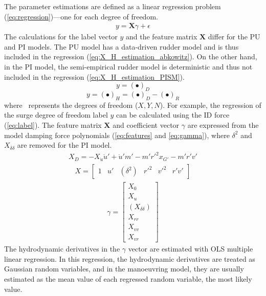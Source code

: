 The parameter estimations are defined as a linear regression problem (\autoref{eq:regression})---one for each degree of freedom. 
\begin{equation}\label{eq:regression}
\begin{split}y = \mathbf{X}\gamma + \epsilon\end{split}
\end{equation}
The calculations for the label vector \(y\) and the feature matrix \(\textbf{X}\) differ for the PU and PI models. The PU model has a data-driven rudder model and is thus included in the regression (\autoref{eq:X_H_estimation_abkowitz}). On the other hand, in the PI model, the semi-empirical rudder model is deterministic and thus not included in the regression (\autoref{eq:X_H_estimation_PISM}). 
\begin{equation}
    \label{eq:X_H_estimation_abkowitz}
    y = (\bullet)_D
\end{equation}
\begin{equation}
    \label{eq:X_H_estimation_PISM}
    y = (\bullet)_H = (\bullet)_D - (\bullet)_R
\end{equation}
where \textbullet\ represents the degrees of freedom ($X,Y,N$).
For example, the regression of the surge degree of freedom label \(y\) can be calculated using the ID force (\autoref{eq:label}). 
The feature matrix \(\textbf{X}\) and coefficient vector $\gamma$ are expressed from the model damping force polynomials (\autoref{eq:features} and \autoref{eq:gamma}), where $\delta^2$ and $X_{\delta\delta}$ are removed for the PI model.
\begin{equation}\label{eq:label}
\begin{split}\displaystyle X_D = - X_{\dot{u}} \dot{u}' + \dot{u}' m' - m' r'^{2} x_{G'} - m' r' v'\end{split}
\end{equation}
\begin{equation}\label{eq:features}
\begin{split}\displaystyle X = \left[\begin{matrix}1 & u' & (\delta^{2}) & r'^{2} & v'^{2} & r' v'\end{matrix}\right]\end{split}
\end{equation}
\begin{equation}\label{eq:gamma}
\begin{split}\displaystyle \gamma = \left[\begin{matrix}X_{0}\\X_{u}\\(X_{\delta\delta})\\X_{rr}\\X_{vv}\\X_{vr}\end{matrix}\right]\end{split}
\end{equation}
The hydrodynamic derivatives in the \(\gamma\) vector are estimated with OLS multiple linear regression.
In this regression, the hydrodynamic derivatives are treated as Gaussian random variables, and in the manoeuvring model, they are usually estimated as the mean value of each regressed random variable, the most likely value.

